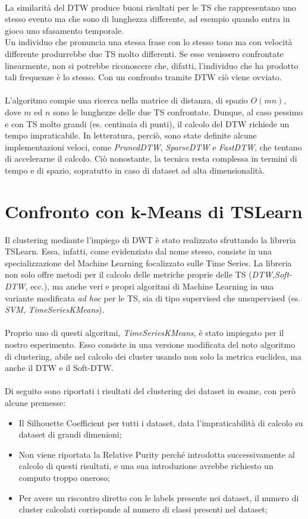 \\
La similarità del DTW produce buoni risultati per le TS che rappresentano uno stesso evento ma che sono di lunghezza differente, ad esempio quando entra in gioco uno sfasamento temporale.\\
Un individuo che pronuncia una stessa frase con lo stesso tono ma con velocità differente produrrebbe due TS molto differenti. Se esse venissero confrontate linearmente, non si potrebbe riconoscere che, difatti, l'individuo che ha prodotto tali frequenze è lo stesso. Con un confronto tramite DTW ciò viene ovviato.\\
\\
L'algoritmo compie una ricerca nella matrice di distanza, di spazio $O(mn)$, dove $m$ ed $n$ sono le lunghezze delle due TS confrontate.
Dunque, al caso pessimo e con TS molto grandi (es. centinaia di punti), il calcolo del DTW richiede un tempo impraticabile. In letteratura, perciò, sono state definite alcune implementazioni veloci, come \textit{PrunedDTW}, \textit{SparseDTW} e \textit{FastDTW}, che tentano di accelerarne il calcolo. Ciò nonostante, la tecnica resta complessa in termini di tempo e di spazio, sopratutto in caso di dataset ad alta dimensionalità.\\

\section{Confronto con k-Means di TSLearn}
Il clustering mediante l'impiego di DWT è stato realizzato sfruttando la libreria TSLearn.
Essa, infatti, come evidenziato dal nome stesso, consiste in una specializzazione del Machine Learning focalizzato sulle Time Series.
La libreria non solo offre metodi per il calcolo delle metriche proprie delle TS (\textit{DTW},\textit{Soft-DTW}, ecc.), ma anche veri e propri algoritmi di Machine Learning in una variante modificata \textit{ad hoc} per le TS, sia di tipo supervised che unsupervised (es. \textit{SVM}, \textit{TimeSeriesKMeans}).\\
\\
Proprio uno di questi algoritmi, \textit{TimeSeriesKMeans}, è stato impiegato per il nostro esperimento.
Esso consiste in una versione modificata del noto algoritmo di clustering, abile nel calcolo dei cluster usando non solo la metrica euclidea, ma anche il DTW e il Soft-DTW.\\
\\
Di seguito sono riportati i risultati del clustering dei dataset in esame, con però alcune premesse:
\begin{itemize}
	\item Il Silhouette Coefficient per tutti i dataset, data l'impraticabilità di calcolo su dataset di grandi dimenioni;
	\item Non viene riportata la Relative Purity perché introdotta successivamente al calcolo di questi risultati, e una sua introduzione avrebbe richiesto un computo troppo oneroso;
	\item Per avere un riscontro diretto con le labels presente nei dataset, il numero di cluster calcolati corrisponde al numero di classi presenti nel dataset;
\end{itemize}

